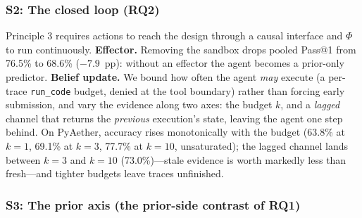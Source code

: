\subsubsection{S2: The closed loop (RQ2)}
\label{sec:closed-loop}

Principle 3 requires actions to reach the design through a causal interface and $\Phi$ to run continuously. \textbf{Effector.} Removing the sandbox drops pooled Pass@1 from 76.5\% to 68.6\% ($-7.9$~pp): without an effector the agent becomes a prior-only predictor. \textbf{Belief update.} We bound how often the agent \emph{may} execute (a per-trace \texttt{run\_code} budget, denied at the tool boundary) rather than forcing early submission, and vary the evidence along two axes: the budget $k$, and a \emph{lagged} channel that returns the \emph{previous} execution's state, leaving the agent one step behind. On PyAether, accuracy rises monotonically with the budget (63.8\% at $k{=}1$, 69.1\% at $k{=}3$, 77.7\% at $k{=}10$, unsaturated); the lagged channel lands between $k{=}3$ and $k{=}10$ (73.0\%)---stale evidence is worth markedly less than fresh---and tighter budgets leave traces unfinished.

\subsubsection{S3: The prior axis (the prior-side contrast of RQ1)}
\label{sec:k-axis}

